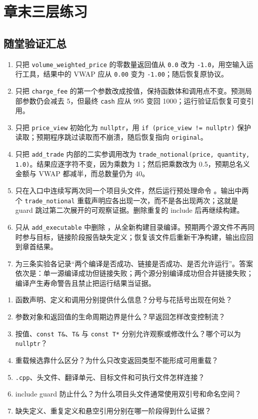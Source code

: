 \section{章末三层练习}

\subsection*{随堂验证汇总}

\begin{enumerate}
  \item 只把 \texttt{volume\_weighted\_price} 的零数量返回值从 \texttt{0.0} 改为 \texttt{-1.0}，用空输入运行工具，结果中的 VWAP 应从 \texttt{0.00} 变为 \texttt{-1.00}；随后恢复原协议。
  \item 只把 \texttt{charge\_fee} 的第一个参数改成按值，保持函数体和调用点不变。预测局部参数仍会减去 5，但最终 \texttt{cash} 应从 995 变回 1000；运行验证后恢复可变引用。
  \item 只把 \texttt{price\_view} 初始化为 \texttt{nullptr}，用 \texttt{if (price\_view != nullptr)} 保护读取；预期程序跳过读取而不崩溃，随后恢复指向 \texttt{original}。
  \item 只把 \texttt{add\_trade} 内部的二实参调用改为 \texttt{trade\_notional(price, quantity, 1.0)}。结果应逐字符不变，因为乘数为 1；然后把乘数改为 0.5，预期总名义金额与 VWAP 都减半，而总数量仍为 40。
  \item 只在入口中连续写两次同一个项目头文件，然后运行预处理命令 。输出中两个 \texttt{trade\_notional} 重载声明应各出现一次，而不是各出现两次；这就是 guard 跳过第二次展开的可观察证据。删除重复的 include 后再继续构建。
  \item 只从 \texttt{add\_executable} 中删除 ，从全新构建目录编译。预期两个源文件不再同时参与目标，链接阶段报告缺失定义；恢复该文件后重新干净构建，输出应回到章首结果。
  \item 为三条实验各记录“两个编译是否成功、链接是否成功、是否允许运行”。答案依次是：单一源编译成功但链接失败；两个源分别编译成功但合并链接失败；编译产生寿命警告且禁止把运行结果当证据。
\end{enumerate}

\begin{enumerate}
  \item 函数声明、定义和调用分别提供什么信息？分号与花括号出现在何处？
  \item 参数对象和返回值的生命周期边界是什么？早返回怎样改变控制流？
  \item 按值、\texttt{const T\&}、\texttt{T\&} 与 \texttt{const T*} 分别允许观察或修改什么？哪个可以为 \texttt{nullptr}？
  \item 重载候选靠什么区分？为什么只改变返回类型不能形成可用重载？
  \item \texttt{.cpp}、头文件、翻译单元、目标文件和可执行文件怎样连接？
  \item include guard 防止什么？为什么项目头文件通常使用双引号和命名空间？
  \item 缺失定义、重复定义和悬空引用分别在哪一阶段得到什么证据？
\end{enumerate}


